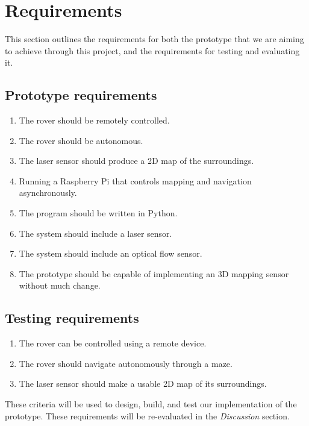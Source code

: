 \section{Requirements}

This section outlines the requirements for both the prototype that we are aiming to achieve through this project, and the requirements for testing and evaluating it.

\subsection{Prototype requirements}

\begin{enumerate}
	
	\item The rover should be remotely controlled.
	\item The rover should be autonomous.
	\item The laser sensor should produce a 2D map of the surroundings.
	\item Running a Raspberry Pi that controls mapping and navigation asynchronously.
	\item The program should be written in Python.
	\item The system should include a laser sensor.
	\item The system should include an optical flow sensor.
 	\item The prototype should be capable of implementing an 3D mapping sensor without much change. %
	
\end{enumerate}

\subsection{Testing requirements}

\begin{enumerate}
	
	\item The rover can be controlled using a remote device.
	\item The rover should navigate autonomously through a maze. %
	\item The laser sensor should make a usable 2D map of its surroundings.
	
\end{enumerate}

These criteria will be used to design, build, and test our implementation of the prototype. These requirements will be re-evaluated in the \textit{Discussion} section.
